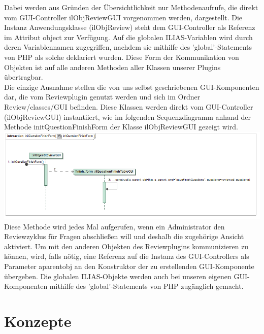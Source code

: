 \documentclass[a4paper]{scrreprt}
\begin{document}
Dabei werden aus Gründen der Übersichtlichkeit nur Methodenaufrufe, die direkt vom GUI-Controller ilObjReviewGUI vorgenommen werden, dargestellt. Die Instanz Anwendungsklasse (ilObjReview) steht dem GUI-Controller als Referenz im Attribut object zur Verfügung. Auf die globalen ILIAS-Variablen wird durch deren Variablennamen zugegriffen, nachdem sie mithilfe des 'global'-Statements von PHP als solche deklariert wurden. Diese Form der Kommunikation von Objekten ist auf alle anderen Methoden aller Klassen unserer Plugins übertragbar.\\
Die einzige Ausnahme stellen die von uns selbst geschriebenen GUI-Komponenten dar, die vom Reviewplugin genutzt werden und sich im Ordner Review/classes/GUI befinden. Diese Klassen werden direkt vom GUI-Controller (ilObjReviewGUI) instantiiert, wie im folgenden Sequenzdiagramm anhand der Methode initQuestionFinishForm der Klasse ilObjReviewGUI gezeigt wird.\\
\includegraphics[width=1.0\textwidth]{Sequence_Diagram__initQuestionFinishForm__initQuestionFinishForm}
\label{Iniziiere Finale Fragenform}\\ 
Diese Methode wird jedes Mal aufgerufen, wenn ein Administrator den Reviewzyklus für Fragen abschließen will und deshalb die zugehörige Ansicht aktiviert. Um mit den anderen Objekten des Reviewplugins kommunizieren zu können, wird, falls nötig, eine Referenz auf die Instanz des GUI-Controllers als Parameter a\textunderscore parent\textunderscore obj an den Konstruktor der zu erstellenden GUI-Komponente übergeben. Die globalen ILIAS-Objekte werden auch bei unseren eigenen GUI-Komponenten mithilfe des 'global'-Statements von PHP zugänglich gemacht.
\chapter{Konzepte}
\end{document}
